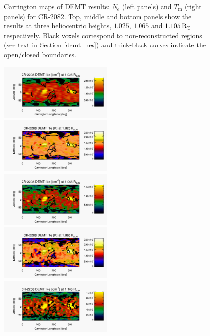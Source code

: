 \documentclass[namedreferences]{solarphysics}
\newcommand{\mrsun}{{\rm R_\odot}}
\begin{document}
\begin{article}
\begin{figure}[h!]
\begin{center}
\caption{Carrington maps of DEMT results: $N_e$ (left panels) and $T_\textrm{m}$ (right panels) for CR-2082. Top, middle and bottom panels show the results at three heliocentric heights, $1.025$, $1.065$ and $1.105\,\mrsun$ respectively. Black voxels correspond to non-reconstructed regions (see text in Section \ref{demt_res}) and thick-black curves indicate the open/closed boundaries.}
\label{carmaps_demt_2082}
\end{center}
\end{figure}

\begin{figure}[h!]
\begin{center}
\includegraphics[width=0.495\textwidth]{figs/map_Ne_CR2208_DEMT-AIA_H1_L522_r3d_1025_Rsun.pdf}
\includegraphics[width=0.495\textwidth]{figs/map_Tm_CR2208_DEMT-AIA_H1_L522_r3d_1025_Rsun.pdf}
\includegraphics[width=0.495\textwidth]{figs/map_Ne_CR2208_DEMT-AIA_H1_L522_r3d_1065_Rsun.pdf}
\includegraphics[width=0.495\textwidth]{figs/map_Tm_CR2208_DEMT-AIA_H1_L522_r3d_1065_Rsun.pdf}
\includegraphics[width=0.495\textwidth]{figs/map_Ne_CR2208_DEMT-AIA_H1_L522_r3d_1105_Rsun.pdf}

\end{center}
\end{figure}
\end{article}
\end{document}
